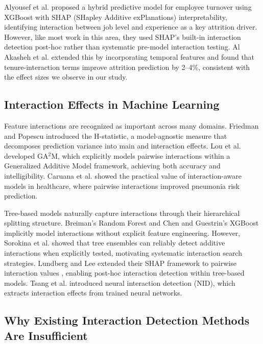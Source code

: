\documentclass[conference]{IEEEtran}
\begin{document}
Alyousef et al. \cite{alyousef2026hybrid} proposed a hybrid predictive model for employee turnover using XGBoost with SHAP (SHapley Additive exPlanations) interpretability, identifying interaction between job level and experience as a key attrition driver. However, like most work in this area, they used SHAP's built-in interaction detection post-hoc rather than systematic pre-model interaction testing. Al Akasheh et al. \cite{alakasheh2023decade} extended this by incorporating temporal features and found that tenure-interaction terms improve attrition prediction by 2--4\%, consistent with the effect sizes we observe in our study.

\subsection{Interaction Effects in Machine Learning}

Feature interactions are recognized as important across many domains. Friedman and Popescu \cite{friedman2008predictive} introduced the H-statistic, a model-agnostic measure that decomposes prediction variance into main and interaction effects. Lou et al. \cite{lou2013accurate} developed GA$^2$M, which explicitly models pairwise interactions within a Generalized Additive Model framework, achieving both accuracy and intelligibility. Caruana et al. \cite{caruana2015intelligible} showed the practical value of interaction-aware models in healthcare, where pairwise interactions improved pneumonia risk prediction.

Tree-based models naturally capture interactions through their hierarchical splitting structure. Breiman's Random Forest \cite{breiman2001random} and Chen and Guestrin's XGBoost \cite{chen2016xgboost} implicitly model interactions without explicit feature engineering. However, Sorokina et al. \cite{sorokina2008detecting} showed that tree ensembles can reliably detect additive interactions when explicitly tested, motivating systematic interaction search strategies. Lundberg and Lee \cite{lundberg2017unified} extended their SHAP framework to pairwise interaction values \cite{lundberg2020shap}, enabling post-hoc interaction detection within tree-based models. Tsang et al. \cite{tsang2018detecting} introduced neural interaction detection (NID), which extracts interaction effects from trained neural networks.

\subsection{Why Existing Interaction Detection Methods Are Insufficient}
\end{document}
